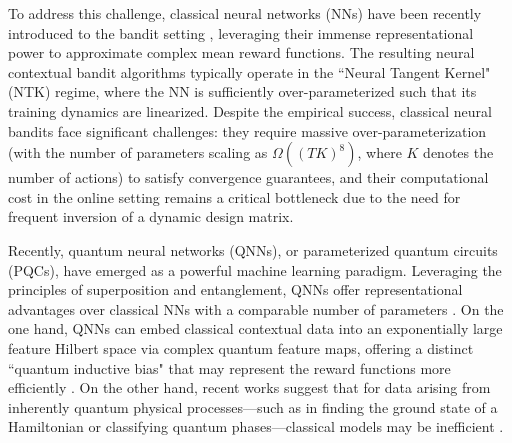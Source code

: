\documentclass[pdflatex,sn-mathphys-num]{sn-jnl}%
\theoremstyle{thmstyleone}%
\theoremstyle{thmstyletwo}%
\theoremstyle{thmstylethree}%
\newcommand{\bigOmega}{\Omega}
\begin{document}
To address this challenge, classical neural networks (NNs) have been recently introduced to the bandit setting \cite{riquelme2018deep, zahavy2019deep, neuralucb, zhang2020neural}, leveraging their immense representational power to approximate complex mean reward functions. The resulting neural contextual bandit algorithms typically operate in the ``Neural Tangent Kernel" (NTK) regime, where the NN is sufficiently over-parameterized such that its training dynamics are linearized. Despite the empirical success, classical neural bandits face significant challenges: they require massive over-parameterization (with the number of parameters scaling as $\bigOmega((TK)^8)$, %
where $K$ denotes the number of actions) to satisfy convergence guarantees, and their computational cost in the online setting remains a critical bottleneck due to the need for frequent inversion of a dynamic design matrix.

Recently, quantum neural networks (QNNs), or parameterized quantum circuits (PQCs), have emerged as a powerful machine learning paradigm. Leveraging the principles of superposition and entanglement, QNNs   offer representational advantages over classical NNs with a comparable number of parameters
\cite{schuld2020circuit,du2020expressive, abbas2021power}. On the one hand, QNNs can embed classical contextual data into an exponentially large feature Hilbert space via complex quantum feature maps, offering a distinct ``quantum inductive bias" that may represent the reward functions more efficiently \cite{schuld2021effect}.  On the other hand,   recent works suggest that for data arising from inherently quantum physical processes---such as in finding the ground state of a Hamiltonian or classifying quantum phases---classical models may be inefficient \cite{kubler2021inductive, uvarov2020machine}. 
\end{document}

